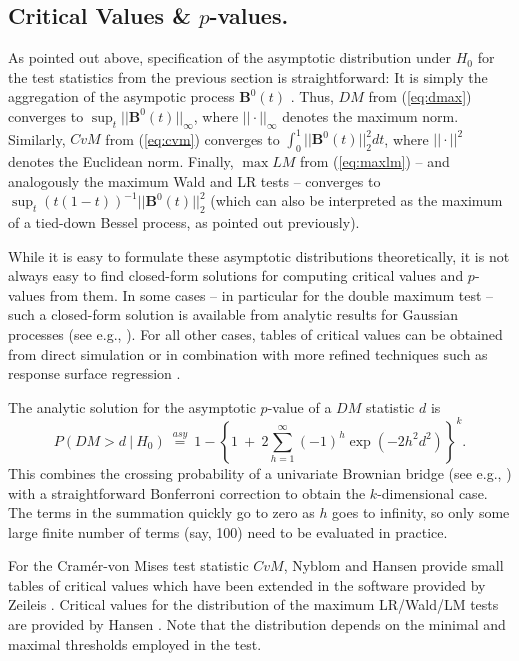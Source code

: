 \documentclass[man]{apa}
\begin{document}
\subsection{Critical Values \& $p$-values.}

As pointed out above, specification of the asymptotic distribution under $H_0$ for the test
statistics from the previous section is straightforward: It is simply the aggregation
of the asympotic process ${\bm B}^0(t)$ \cite{HjoKon02,ZeiHor07}. Thus, $\mathit{DM}$
from (\ref{eq:dmax}) converges to $\sup_t || {\bm B}^0(t) ||_{\infty}$, where
$||\cdot||_\infty$ denotes the maximum norm. Similarly, $\mathit{CvM}$
from (\ref{eq:cvm}) converges to $\int_0^1 || {\bm B}^0(t) ||_2^2 d t$, where $||\cdot||^2$
denotes the Euclidean norm. Finally, $\max \mathit{LM}$ from (\ref{eq:maxlm}) -- and analogously
the maximum Wald and LR tests -- converges to $\sup_t (t (1-t))^{-1} || {\bm B}^0(t) ||_2^2$
(which can also be interpreted as the maximum of a tied-down Bessel process, as pointed out
previously).

While it is easy to formulate these asymptotic distributions theoretically,
it is not always easy to find closed-form solutions for computing critical
values and $p$-values from them. In some cases -- in particular for the double maximum test --
such a closed-form solution is available from analytic results for Gaussian
processes (see e.g., ). For all other cases, tables of critical
values can be obtained from direct simulation \cite{Zei06} or in combination with
more refined techniques such as response surface regression \cite{Han97}.

The analytic solution for the asymptotic $p$-value of a $\mathit{DM}$ statistic
$d$ is
\begin{equation}
    \label{eq:absmax_p}
        P(\mathit{DM} > d ~|~ H_0) ~\overset{asy}{=}~ 1 - \left\{1 ~+~ 2 \sum_{h = 1}^{\infty} (-1)^h \exp(-2 h^2 d^2) \right\}^k.
\end{equation}
This combines the crossing probability of a univariate Brownian bridge
(see e.g., ) with a straightforward Bonferroni
correction to obtain the $k$-dimensional case. The terms in the summation
quickly go to zero as $h$ goes to infinity, so only some large finite
number of terms (say, 100) need to be evaluated in practice.

For the Cram\'{e}r-von Mises test statistic $\mathit{CvM}$, Nyblom \citeyear{Nyb89}
and Hansen \citeyear{Han92} provide small tables of critical values which
have been extended in the software provided by Zeileis \citeyear{Zei06}.
Critical values for the distribution of the maximum LR/Wald/LM tests
are provided by Hansen \citeyear{Han97}. Note that the distribution depends on
the minimal and maximal thresholds employed in the test.
\end{document}
